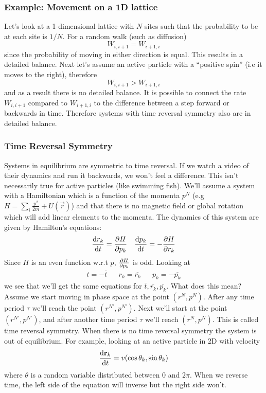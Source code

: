 \subsubsection{Example: Movement on a 1D lattice}
Let's look at a 1-dimensional lattice with \(N\) sites such that the probability to be at each site is \(1/N\). For a random walk (such as diffusion)
\begin{equation}
	W_{i,i+1} = W_{i+1,i}
\end{equation}
since the probability of moving in either direction is equal. This results in a detailed balance. Next let's assume an active particle with a ``positive spin'' (i.e it moves to the right), therefore
\begin{equation}
	W_{i,i+1} > W_{i+1,i}
\end{equation}
and as a result there is no detailed balance. It is possible to connect the rate \(W_{i,i+1}\) compared to \(W_{i+1,i}\) to the difference between a step forward or backwards in time. Therefore systems with time reversal symmetry also are in detailed balance.
\subsubsection{Time Reversal Symmetry}
Systems in equilibrium are symmetric to time reversal. If we watch a video of their dynamics and run it backwards, we won't feel a difference. This isn't necessarily true for active particles (like swimming fish). We'll assume a system with a Hamiltonian which is a function of the momenta \(p^N\) (e.g \(H=\sum\limits_i\frac{p^2}{2m}+U(\vec r)\)) and that there is no magnetic field or global rotation which will add linear elements to the momenta. The dynamics of this system are given by Hamilton's equations:
\begin{align}
	\diff{r_k}{t} = \diffp{H}{p_k} && \diff{p_k}{t} = -\diffp{H}{r_k}
\end{align}
Since \(H\) is an even function w.r.t \(p\), \(\diffp{H}{p_k}\) is odd. Looking at
\begin{align}
	t = -\overline{t} && r_k = \overline{r_k} && p_k = -\overline{p_k}
\end{align}
we see that we'll get the same equations for \(\overline{t}, \overline{r_k}, \overline{p_k}\). What does this mean? Assume we start moving in phase space at the point \((r^N,p^N)\). After any time period \(\tau \) we'll reach the point \((r^{N'},p^{N'})\). Next we'll start at the point \((r^{N'},p^{N'})\), and after another time period \(\tau \) we'll reach \((r^N,p^N)\). This is called time reversal symmetry. When there is no time reversal symmetry the system is out of equilibrium. For example, looking at an active particle in 2D with velocity
\begin{align}
	\diff{\vec r_k}{t} = v(\cos\theta_k,\sin\theta_k)
\end{align}
where \(\theta \) is a random variable distributed between 0 and \(2\pi \). When we reverse time, the left side of the equation will inverse but the right side won't.
\newpage
